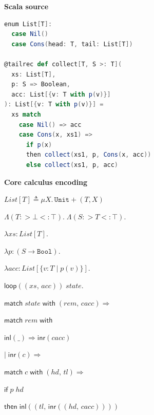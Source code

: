 \begin{figure}[t]
\small
\begin{minipage}[t]{0.49\textwidth}
\noindent\textbf{Scala source}

\vspace{0.5em}
\begin{lstlisting}[language=Scala,basicstyle=\ttfamily\codesize,morekeywords={@tailrec,then}]
enum List[T]:
  case Nil()
  case Cons(head: T, tail: List[T])

@tailrec def collect[T, S >: T](
  xs: List[T],
  p: S => Boolean,
  acc: List[{v: T with p(v)}]
): List[{v: T with p(v)}] =
  xs match
    case Nil() => acc
    case Cons(x, xs1) =>
      if p(x)
      then collect(xs1, p, Cons(x, acc))
      else collect(xs1, p, acc)
\end{lstlisting}

\end{minipage}%
\hfill%
\begin{minipage}[t]{0.49\textwidth}
\noindent\textbf{Core calculus encoding}

\vspace{1em}


$\mathit{List}[T] \triangleq \mu X.\, \texttt{Unit} + (T, X)$

\vspace{2.5em}

$\Lambda (T :> \bot <: \top).\; \Lambda (S :> T <: \top).$

\quad$\lambda \mathit{xs}{:}\mathit{List}[T].$

\quad$\lambda p{:}(S \to \texttt{Bool}).$

\quad$\lambda \mathit{acc}{:}\mathit{List}[\{v : T \mid p(v)\}].$

\qquad$\textsf{loop}((\mathit{xs},\, \mathit{acc}))\; \mathit{state}.\;$

\qquad\quad$\textsf{match}\; \mathit{state} \;\textsf{with}\; (\mathit{rem},\, \mathit{cacc}) \Rightarrow$

\qquad\qquad$\textsf{match}\; \mathit{rem} \;\textsf{with}$

\qquad\qquad\quad$\textsf{inl}(\_) \Rightarrow \textsf{inr}(\mathit{cacc})$

\qquad\qquad$\mid\; \textsf{inr}(c) \Rightarrow$

\qquad\qquad\quad$\textsf{match}\; c \;\textsf{with}\; (\mathit{hd},\, \mathit{tl}) \Rightarrow$

\qquad\qquad\qquad$\textsf{if}\; p\;\mathit{hd}$

\qquad\qquad\qquad$\textsf{then}\; \textsf{inl}((\mathit{tl},\, \textsf{inr}((\mathit{hd},\, \mathit{cacc}))))$


\end{minipage}
\end{figure}
